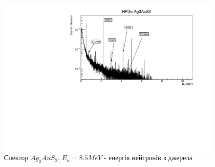 \documentclass[a4paper, 14pt]{article}
\numberwithin{equation}{section}
\numberwithin{table}{section}
\begin{document}
\begin{figure}[hbt!]
	\centering \includegraphics[width=1\textwidth]{res/Au_AnzSpectr.pdf}
	\caption{Спектор $Ag_3AuS_2$, $E_{n} = 8.5 MeV$ - енергія нейтронів з джерела} 
	\label{ris:senst}	
\end{figure}  
\pagebreak
\newpage	
\end{document}
